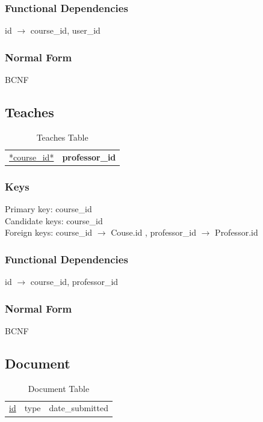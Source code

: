 \documentclass[11pt]{article}
\begin{document}
\subsubsection{Functional Dependencies}
\label{sec-3-6-2}


    id $\rightarrow$ course\_id, user\_id
\subsubsection{Normal Form}
\label{sec-3-6-3}


    BCNF
\subsection{Teaches}
\label{sec-3-7}


\begin{table}[htb]
\caption{Teaches Table} 
\begin{center}
\begin{tabular}{ll}
 \underline{*course\_id*}  &  \textbf{professor\_id}  \\
\end{tabular}
\end{center}
\end{table}
\subsubsection{Keys}
\label{sec-3-7-1}

    
    Primary key: course\_id\\    
    Candidate keys: course\_id\\
    Foreign keys: course\_id $\rightarrow$ Couse.id , professor\_id $\rightarrow$ Professor.id
\subsubsection{Functional Dependencies}
\label{sec-3-7-2}


    id $\rightarrow$ course\_id, professor\_id
\subsubsection{Normal Form}
\label{sec-3-7-3}


    BCNF
\subsection{Document}
\label{sec-3-8}


\begin{table}[htb]
\caption{Document Table} 
\begin{center}
\begin{tabular}{lll}
 \underline{id}  &  type  &  date\_submitted  \\
\end{tabular}
\end{center}
\end{table}
\end{document}
